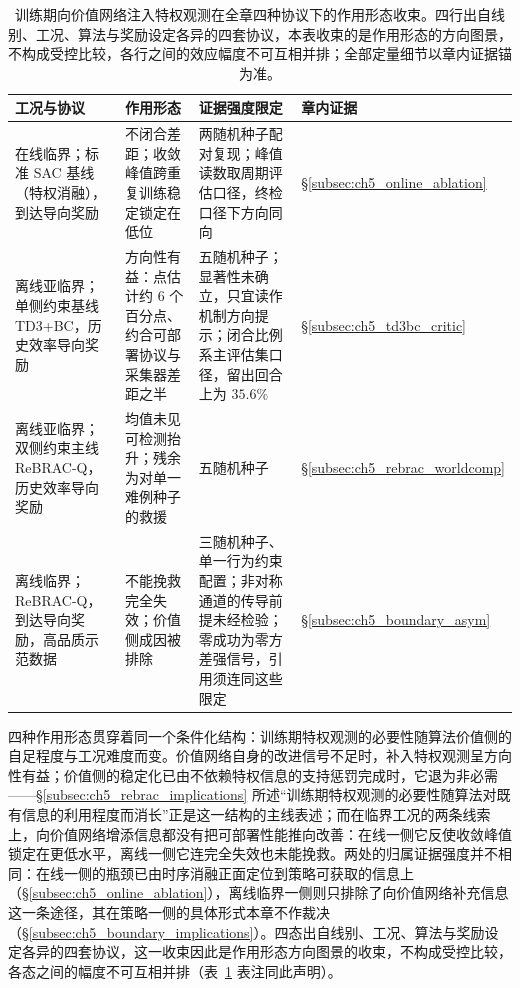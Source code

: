 \begin{table}[t]
\centering
\caption{训练期向价值网络注入特权观测在全章四种协议下的作用形态收束。四行出自线别、工况、算法与奖励设定各异的四套协议，本表收束的是作用形态的方向图景，不构成受控比较，各行之间的效应幅度不可互相并排；全部定量细节以章内证据锚为准。}
\label{tab:ch5_discussion_priv_states}
\small
\setlength{\tabcolsep}{4pt}
\begin{tabular}{p{34mm} p{44mm} p{36mm} l}
\toprule
\textbf{工况与协议} & \textbf{作用形态} & \textbf{证据强度限定} & \textbf{章内证据} \\
\midrule
在线临界；标准 SAC 基线（特权消融），到达导向奖励 & 不闭合差距；收敛峰值跨重复训练稳定锁定在低位 & 两随机种子配对复现；峰值读数取周期评估口径，终检口径下方向同向 & \S\ref{subsec:ch5_online_ablation} \\
\addlinespace
离线亚临界；单侧约束基线 TD3+BC，历史效率导向奖励 & 方向性有益：点估计约 $6$ 个百分点、约合可部署协议与采集器差距之半 & 五随机种子；显著性未确立，只宜读作机制方向提示；闭合比例系主评估集口径，留出回合上为 $35.6\%$ & \S\ref{subsec:ch5_td3bc_critic} \\
\addlinespace
离线亚临界；双侧约束主线 ReBRAC-Q，历史效率导向奖励 & 均值未见可检测抬升；残余为对单一难例种子的救援 & 五随机种子 & \S\ref{subsec:ch5_rebrac_worldcomp} \\
\addlinespace
离线临界；ReBRAC-Q，到达导向奖励，高品质示范数据 & 不能挽救完全失效；价值侧成因被排除 & 三随机种子、单一行为约束配置；非对称通道的传导前提未经检验；零成功为零方差强信号，引用须连同这些限定 & \S\ref{subsec:ch5_boundary_asym} \\
\bottomrule
\end{tabular}
\end{table}

四种作用形态贯穿着同一个条件化结构：训练期特权观测的必要性随算法价值侧的自足程度与工况难度而变。价值网络自身的改进信号不足时，补入特权观测呈方向性有益；价值侧的稳定化已由不依赖特权信息的支持惩罚完成时，它退为非必需——\S\ref{subsec:ch5_rebrac_implications} 所述“训练期特权观测的必要性随算法对既有信息的利用程度而消长”正是这一结构的主线表述；而在临界工况的两条线索上，向价值网络增添信息都没有把可部署性能推向改善：在线一侧它反使收敛峰值锁定在更低水平，离线一侧它连完全失效也未能挽救。两处的归属证据强度并不相同：在线一侧的瓶颈已由时序消融正面定位到策略可获取的信息上（\S\ref{subsec:ch5_online_ablation}），离线临界一侧则只排除了向价值网络补充信息这一条途径，其在策略一侧的具体形式本章不作裁决（\S\ref{subsec:ch5_boundary_implications}）。四态出自线别、工况、算法与奖励设定各异的四套协议，这一收束因此是作用形态方向图景的收束，不构成受控比较，各态之间的幅度不可互相并排（表~\ref{tab:ch5_discussion_priv_states} 表注同此声明）。

